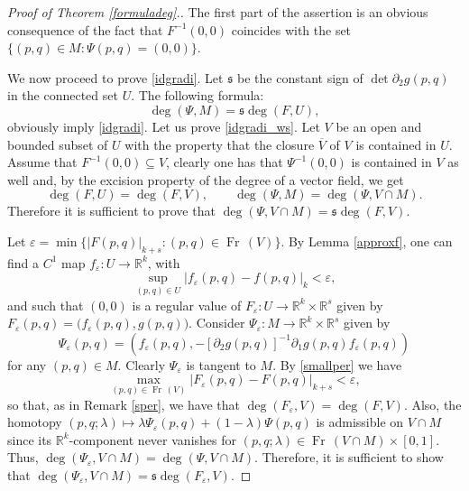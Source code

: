 \documentclass[a4paper]{amsart}
\numberwithin{equation}{section}
\DeclareMathOperator{\Fr}{\mathrm{Fr}\,}
\newcommand{\cl}[1]{\overline{#1}}
\newcommand{\R}{\mathbb{R}}
\newcommand{\e}{\varepsilon}
\newcommand{\s}{\mathfrak{s}}
\begin{document}
\begin{proof}[Proof of Theorem \ref{formuladeg}.]

 The first part of the assertion is an obvious consequence of the fact that $F^{-1}(0,0)$ 
coincides with the set $\{(p,q)\in M:\Psi(p,q)=(0,0)\}$. 

We now proceed to prove \eqref{idgradi}. Let $\s$ be the constant sign of $\det\partial_2g(p,q)$ 
in the connected set $U$. The following formula: 
\begin{equation}\label{idgradi_ws}
 \deg(\Psi,M)=\s  \deg(F,U),
\end{equation}
obviously imply \eqref{idgradi}. Let us prove \eqref{idgradi_ws}. Let $V$ be an open and 
bounded subset of $U$ with the property that the closure $\cl{V}$ of $V$ is contained in 
$U$. Assume that $F^{-1}(0,0)\subseteq V$, clearly one has that $\Psi^{-1}(0,0)$ is contained 
in $V$ as well and, by the excision property of the degree of a vector field, we get
\[
 \deg(F,U)=\deg(F,V),\qquad \deg(\Psi, M)=\deg(\Psi,V\cap M).
\]
Therefore it is sufficient to prove that $\deg(\Psi,V\cap M)=\s\deg(F,V)$. 

Let $\e=\min\{|F(p,q)|_{k+s}:(p,q)\in\Fr(V)\}$. By Lemma \ref{approxf}, one can find a 
$C^1$ map $f_\e:U\to\R^k$, with 
\begin{equation}\label{smallper}
  \sup_{(p,q)\in U}\big|f_\e(p,q)-f(p,q)\big|_k<\e,
\end{equation}
and such that $(0,0)$ is a regular value of $F_\e:U\to\R^k\times\R^s$ given by 
$F_\e(p,q)=\big(f_\e(p,q),g(p,q)\big)$. Consider $\Psi_\e:M\to\R^k\times\R^s$
given by 
\[
\Psi_\e(p,q)=
      \left(f_\e(p,q),-[\partial_2g(p,q)]^{-1}\partial_1g(p,q)f_\e(p,q)\right)
\]
for any $(p,q)\in M$. Clearly $\Psi_\e$ is tangent to $M$. By \eqref{smallper} we have 
\[
  \max_{(p,q)\in\Fr(V)}\big|F_\e(p,q)-F(p,q)\big|_{k+s}<\e,
\]
so that, as in Remark \ref{sper}, we have that $\deg(F_\e,V)=\deg(F,V)$. Also, the homotopy 
$(p,q;\lambda)\mapsto \lambda\Psi_\e(p,q)+(1-\lambda)\Psi(p,q)$ is admissible on $V\cap M$
since its $\R^k$-component never vanishes for $(p,q;\lambda)\in\Fr(V\cap M)\times[0,1]$. 
Thus, $\deg(\Psi_\e,V\cap M)=\deg(\Psi,V\cap M)$. Therefore, it is sufficient to show that $\deg(\Psi_\e,V\cap M)=\s\deg(F_\e,V)$.
 

\end{proof}
\end{document}
